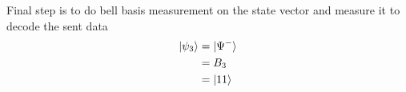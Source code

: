 \documentclass{article}
\begin{document}
  Final step is to do bell basis measurement on the state vector and measure it to decode the sent data\\
  \begin{equation*}
    \begin{split}
      \ket{\psi_3} & = \ket{\Psi^-}\\
      & = B_3\\
      & = \ket{11}
    \end{split}
  \end{equation*}\\
\end{document}
